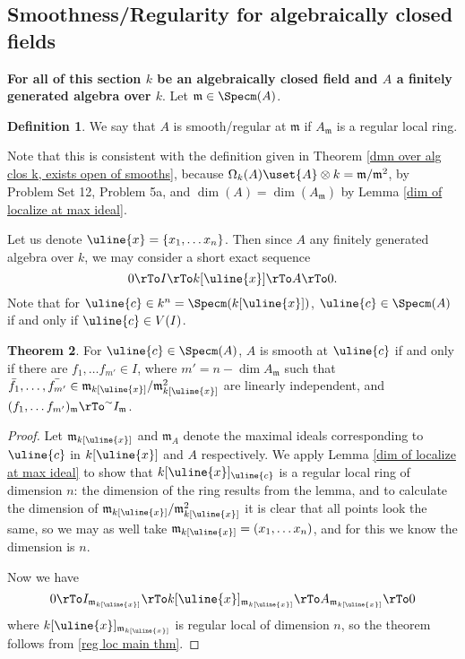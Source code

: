 \documentclass[12 pt]{article}
\theoremstyle{definition}
\newtheorem{thm}{Theorem}[section]
\newtheorem{defn}[thm]{Definition}
\renewcommand{\(}{\left(}
\renewcommand{\)}{\right)}
\newcommand\fm{{\mathfrak m}}
\begin{document}
\subsection{Smoothness/Regularity for algebraically closed fields}

\textbf{For all of this section $k$ be an algebraically closed field and $A$ a finitely generated algebra over $k$}. Let $\fm \in \Specm(A)$.

\begin{defn} We say that $A$ is smooth/regular at $\fm$ if $A_\fm$ is a regular local ring.
\end{defn}

Note that this is consistent with the definition given in Theorem \ref{dmn over alg clos k, exists open of smooths}, because $\Omega_k(A) \uset{A}\otimes k=\fm/\fm^2$, by Problem Set 12, Problem 5a, and $\dim(A)=\dim(A_\fm)$ by Lemma \ref{dim of localize at max ideal}.

Let us denote $\uline{x}=\{x_1, \ldots x_n\}$. Then since $A$ any finitely generated algebra over $k$, we may consider a short exact sequence
\[0 \rTo I \rTo k[\uline{x}] \rTo A \rTo 0.\]
Note that for $\uline{c} \in k^n=\Specm(k[\uline{x}])$, $\uline{c} \in \Specm(A)$ if and only if $\uline{c} \in V(I)$.

\begin{thm} For $\uline{c} \in \Specm(A)$, $A$ is smooth at $\uline{c}$ if and only if there are $f_1, \ldots f_{m'} \in I$, where $m'=n-\dim{A_\fm}$ such that $\bar{f_1}, \ldots , \bar{f_{m'}} \in \fm_{k[\uline{x}]}/\fm_{k[\uline{x}]}^2$ are linearly independent, and $(f_1, \ldots f_{m'})_\fm \rTo^\sim I_\fm$.
\label{smoothness local coordinates}
\end{thm}
\begin{proof} Let $\fm_{k[\uline{x}]}$ and $\fm_A$ denote the maximal ideals corresponding to $\uline{c}$ in $k[\uline{x}]$ and $A$ respectively. We apply Lemma \ref{dim of localize at max ideal} to show that $k[\uline{x}]_{\uline{c}}$ is a regular local ring of dimension $n$: the dimension of the ring results from the lemma, and to calculate the dimension of $\fm_{k[\uline{x}]}/\fm_{k[\uline{x}]}^2$ it is clear that all points look the same, so we may as well take $\fm_{k[\uline{x}]}=(x_1, \ldots x_n)$, and for this we know the dimension is $n$.

Now we have
\[0 \rTo I_{\fm_{k[\uline{x}]}} \rTo k[\uline{x}]_{\fm_{k[\uline{x}]}} \rTo A_{\fm_{k[\uline{x}]}} \rTo 0\]
where $k[\uline{x}]_{\fm_{k[\uline{x}]}}$ is regular local of dimension $n$, so the theorem follows from \ref{reg loc main thm}.
\end{proof}
\end{document}
